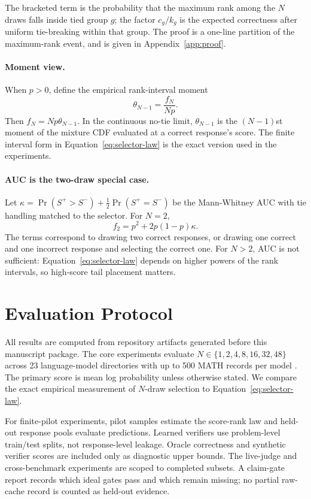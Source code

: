 \documentclass{article}
\newcommand{\Kappa}{\kappa}
\begin{document}
The bracketed term is the probability that the maximum rank among the $N$
draws falls inside tied group $g$; the factor $c_g/k_g$ is the expected
correctness after uniform tie-breaking within that group. The proof is a
one-line partition of the maximum-rank event, and is given in
Appendix~\ref{app:proof}.

\paragraph{Moment view.}
When $p>0$, define the empirical rank-interval moment
\begin{equation}
\theta_{N-1}=\frac{f_N}{Np}.
\end{equation}
Then $f_N=Np\theta_{N-1}$. In the continuous no-tie limit,
$\theta_{N-1}$ is the $(N-1)$st moment of the mixture CDF evaluated at a
correct response's score. The finite interval form in
Equation~\ref{eq:selector-law} is the exact version used in the experiments.

\paragraph{AUC is the two-draw special case.}
Let $\Kappa=\Pr(S^+>S^-)+\tfrac{1}{2}\Pr(S^+=S^-)$ be the Mann-Whitney AUC
with tie handling matched to the selector. For $N=2$,
\begin{equation}
\label{eq:n2}
f_2=p^2+2p(1-p)\Kappa .
\end{equation}
The terms correspond to drawing two correct responses, or drawing one correct
and one incorrect response and selecting the correct one. For $N>2$, AUC is
not sufficient: Equation~\ref{eq:selector-law} depends on higher powers of the
rank intervals, so high-score tail placement matters.

\section{Evaluation Protocol}

All results are computed from repository artifacts generated before this
manuscript package. The core experiments evaluate
$N\in\{1,2,4,8,16,32,48\}$ across 23 language-model directories with up to
500 MATH records per model \citep{hendrycks2021math}. The primary score is
mean log probability unless otherwise stated. We compare the exact empirical
measurement of $N$-draw selection to Equation~\ref{eq:selector-law}.

For finite-pilot experiments, pilot samples estimate the score-rank law and
held-out response pools evaluate predictions. Learned verifiers use
problem-level train/test splits, not response-level leakage. Oracle
correctness and synthetic verifier scores are included only as diagnostic
upper bounds. The live-judge and cross-benchmark experiments are scoped to
completed subsets. A claim-gate report records which ideal gates pass and
which remain missing; no partial raw-cache record is counted as held-out
evidence.
\end{document}
